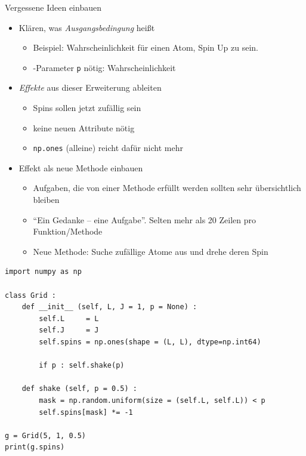 
\begin{frame}[fragile]{Vergessene Ideen einbauen}
%
\begin{itemize}
\item Klären, was \emph{Ausgangsbedingung} heißt
	\begin{itemize}
	\item Beispiel: Wahrscheinlichkeit für einen Atom, Spin Up zu sein.
	\item[\Thus] -Parameter \texttt{p} nötig: Wahrscheinlichkeit
	\end{itemize}
\item \emph{Effekte} aus dieser Erweiterung ableiten
	\begin{itemize}
	\item Spins sollen jetzt zufällig sein
	\item[\Thus] keine neuen Attribute nötig
	\item[\Thus] \texttt{np.ones} (alleine) reicht dafür nicht mehr
	\end{itemize}
\item Effekt als neue Methode einbauen
	\begin{itemize}
	\item Aufgaben, die von einer Methode erfüllt werden sollten sehr übersichtlich bleiben
	\item \enquote{Ein Gedanke -- eine Aufgabe}. Selten mehr als 20 Zeilen pro Funktion/Methode
	\item Neue Methode: Suche zufällige Atome aus und drehe deren Spin
	\end{itemize}
\end{itemize}
%
\end{frame}


\begin{frame}[fragile]
%
\begin{codebox}
\begin{verbatim}
import numpy as np

class Grid :
    def __init__ (self, L, J = 1, p = None) :
        self.L     = L
        self.J     = J
        self.spins = np.ones(shape = (L, L), dtype=np.int64)
        
        if p : self.shake(p)
        
    def shake (self, p = 0.5) :
        mask = np.random.uniform(size = (self.L, self.L)) < p
        self.spins[mask] *= -1

g = Grid(5, 1, 0.5)
print(g.spins)
\end{verbatim}
\end{codebox}
%
\end{frame}

